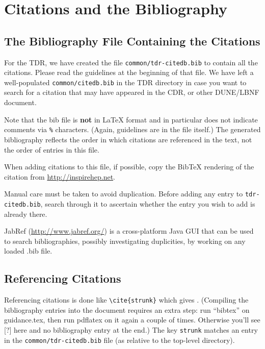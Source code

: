 \section{Citations and the Bibliography}
\label{sec:latex-cit}

\subsection{The Bibliography File Containing the Citations}
\label{sec:latex-bib-file}

For the TDR, we have created the file \texttt{common/tdr-citedb.bib} to contain all the citations. Please read the guidelines at the
beginning of that file. We have left a well-populated \texttt{common/citedb.bib} in the TDR directory in case you want to search for a citation
 that may have appeared in the CDR, or other DUNE/LBNF document.

Note that the bib file is \textbf{not} in \LaTeX{} format and in particular does not
indicate comments via \texttt{\%} characters. (Again, guidelines are in the file itself.)
The
generated bibliography reflects the order in which citations are referenced in the text, not the order of entries in this file.

When adding citations to this file, if possible, copy the BibTeX rendering of the citation from \url{http://inspirehep.net}.

Manual care must be taken to avoid duplication. %
Before adding any entry to \texttt{tdr-citedb.bib}, search through it
to ascertain whether the entry you wish to add is already there.

JabRef (\url{http://www.jabref.org/}) is a cross-platform Java GUI that can be used to search bibliographies, possibly investigating duplicities, by working on any loaded .bib file.

\subsection{Referencing Citations}
\label{sec:latex-ref}

Referencing citations is done like \verb|\cite{strunk}| which gives \cite{strunk}.
(Compiling the bibliography entries into the document requires an extra step: run ``bibtex'' on
 guidance.tex, then run pdflatex on it again a couple of times. Otherwise you'll see [?] here 
 and no bibliography entry at the end.) 
The key \texttt{strunk} matches an entry in the \texttt{common/tdr-citedb.bib}
file (as relative to the top-level directory).

